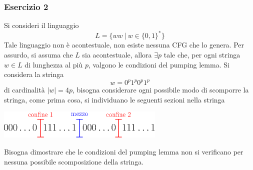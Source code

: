 \documentclass[10pt, letterpaper]{report}
\begin{document}
\subsubsection{Esercizio 2}\label{es2}
Si consideri il linguaggio 
$$ L=\{ww \ | \  w\in\{0,1\}^* \}$$
Tale linguaggio non è acontestuale, non esiste nessuna CFG che lo genera. Per assurdo, si assuma che $L$ sia 
acontestuale, allora $\exists p$ tale che, per ogni stringa $w\in L$ di lunghezza al più 
$p$, valgono le condizioni del pumping lemma. \acc Si considera la stringa $$ w=0^p1^p0^p1^p$$ di cardinalità $|w|=4p$, 
bisogna considerare ogni possibile modo di scomporre la stringa, come prima cosa, si individuano le seguenti sezioni 
nella stringa\begin{center}
    \includegraphics[width=0.6\textwidth ]{images/sezioniStringa4p.eps}
\end{center}
Bisogna dimostrare che le condizioni del pumping lemma non si verificano per nessuna possibile scomposizione della stringa.
\end{document}
